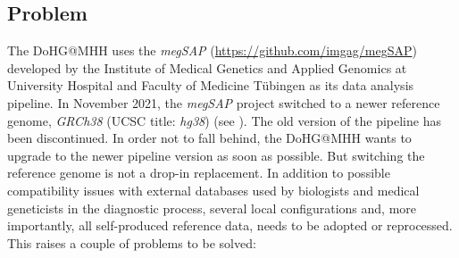 \subsection{Problem}\label{subsection:problem}
The \ac{DoHG@MHH} uses the \textit{\acf{megSAP}} (\url{https://github.com/imgag/megSAP}) developed by the Institute of Medical Genetics and Applied Genomics at University Hospital and Faculty of Medicine T\"ubingen as its data analysis pipeline. In November 2021, the \textit{\ac{megSAP}} project switched to a newer reference genome, \textit{GRCh38} (\ac{UCSC} title: \textit{hg38}) (see \autocites{NLM2013}{Sturm2021}). The old version of the pipeline has been discontinued. In order not to fall behind, the \ac{DoHG@MHH} wants to upgrade to the newer pipeline version as soon as possible. But switching the reference genome is not a drop-in replacement. In addition to possible compatibility issues with external databases used by biologists and medical geneticists in the diagnostic process, several local configurations and, more importantly, all self-produced reference data, needs to be adopted or reprocessed. This raises a couple of problems to be solved:
